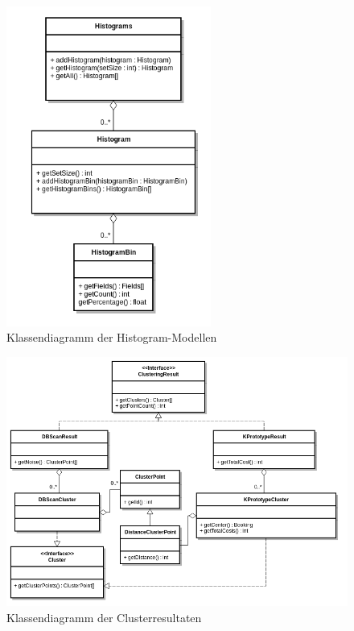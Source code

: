 \begin{figure}[H]
	\centering
	\includegraphics[width=0.6\textwidth]{images/diagram-class-Histograms}
	\caption{Klassendiagramm der Histogram-Modellen}
	\label{fig:proofofconcept:klassenstruktur:6}
\end{figure}
\begin{figure}
	\centering
	\includegraphics[width=1\textwidth]{images/diagram-class-clusters}
	\caption{Klassendiagramm der Clusterresultaten}
	\label{fig:proofofconcept:klassenstruktur:7}
\end{figure}
